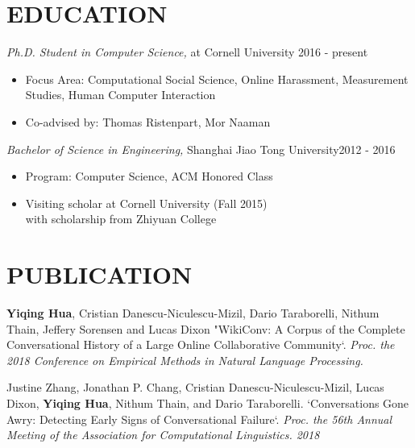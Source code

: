 \documentclass[margin, 10pt]{res} %
\begin{document}
\begin{resume}



\section{EDUCATION}

{\sl Ph.D. Student in Computer Science,} at Cornell University \hfill 2016 - present \\
\begin{itemize}
\item Focus Area: Computational Social Science, Online Harassment, Measurement Studies, Human Computer Interaction
\item Co-advised by: Thomas Ristenpart, Mor Naaman
\end{itemize}
{\sl Bachelor of Science in Engineering,} Shanghai Jiao Tong University\hfill 2012 - 2016\\
\begin{itemize}
\item Program: Computer Science, ACM Honored Class
\item Visiting scholar at Cornell University (Fall 2015) \\with scholarship from Zhiyuan College
\end{itemize}


\section{PUBLICATION}

\textbf{Yiqing Hua}, Cristian Danescu-Niculescu-Mizil, Dario Taraborelli, Nithum Thain, Jeffery Sorensen and Lucas Dixon
"WikiConv: A Corpus of the Complete Conversational History of a Large Online Collaborative Community`.
\textit{Proc. the 2018 Conference on Empirical Methods in Natural Language Processing.}

Justine Zhang, Jonathan P. Chang, Cristian Danescu-Niculescu-Mizil, Lucas Dixon, \textbf{Yiqing Hua}, Nithum Thain, and Dario Taraborelli.
`Conversations Gone Awry: Detecting Early Signs of Conversational Failure`.
\textit{Proc. the 56th Annual Meeting of the Association for Computational Linguistics. 2018}


\end{resume}
\end{document}
